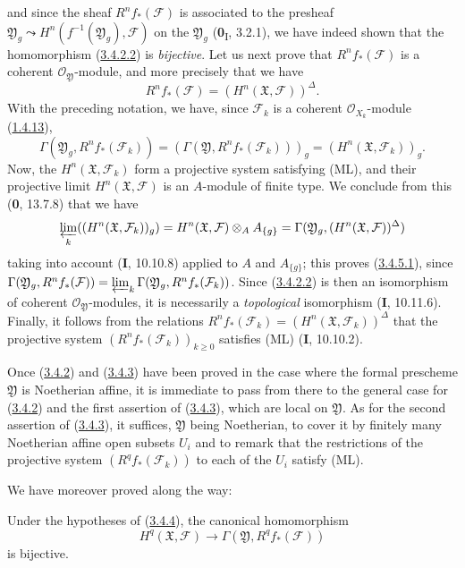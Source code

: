 \begin{env}[3.4.5]
and since the sheaf $R^nf_*(\mathcal F)$ is associated to the presheaf
$\mathfrak Y_g\leadsto H^n(f^{-1}(\mathfrak Y_g),\mathcal F)$ on the
$\mathfrak Y_g$ (\textbf{0}\textsubscript{I}, 3.2.1), we have indeed shown that
the homomorphism (\hyperref[III.3.4.2.2]{3.4.2.2}) is \emph{bijective}. Let us
next prove that $R^nf_*(\mathcal F)$ is a coherent $\mathcal O_{\mathfrak Y}$-module,
and more precisely that we have
\[
R^nf_*(\mathcal F)=(H^n(\mathfrak X,\mathcal F))^\Delta.
\tag{3.4.5.1}\label{III.3.4.5.1}
\]
With the preceding notation, we have, since $\mathcal F_k$ is a coherent
$\mathcal O_{X_k}$-module (\hyperref[III.1.4.13]{1.4.13}),
\[
\Gamma(\mathfrak Y_g,R^nf_*(\mathcal F_k))
=(\Gamma(\mathfrak Y,R^nf_*(\mathcal F_k)))_g
=(H^n(\mathfrak X,\mathcal F_k))_g.
\]
Now, the $H^n(\mathfrak X,\mathcal F_k)$ form a projective system
satisfying (ML), and their projective limit $H^n(\mathfrak X,\mathcal F)$ is
an $A$-module of finite type. We conclude from this (\textbf{0}, 13.7.8) that we have
\[
\varprojlim_k((H^n(\mathfrak X,\mathcal F_k))_g)
=H^n(\mathfrak X,\mathcal F)\otimes_AA_{\{g\}}
=\Gamma(\mathfrak Y_g,(H^n(\mathfrak X,\mathcal F))^\Delta)
\]
taking into account (\textbf{I}, 10.10.8) applied to $A$ and $A_{\{g\}}$; this proves
(\hyperref[III.3.4.5.1]{3.4.5.1}), since $\Gamma(\mathfrak Y_g,R^nf_*(\mathcal F))
=\varprojlim_k\Gamma(\mathfrak Y_g,R^nf_*(\mathcal F_k))$.
Since (\hyperref[III.3.4.2.2]{3.4.2.2}) is then an isomorphism of coherent
$\mathcal O_{\mathfrak Y}$-modules, it is necessarily a
\emph{topological} isomorphism (\textbf{I}, 10.11.6). Finally, it follows from the relations
$R^nf_*(\mathcal F_k)=(H^n(\mathfrak X,\mathcal F_k))^\Delta$ that the projective
system $(R^nf_*(\mathcal F_k))_{k\geq0}$ satisfies (ML) (\textbf{I}, 10.10.2).

Once (\hyperref[III.3.4.2]{3.4.2}) and
(\hyperref[III.3.4.3]{3.4.3}) have been proved in the case where the formal
prescheme $\mathfrak Y$ is Noetherian affine, it is immediate to pass from there to the
general case for (\hyperref[III.3.4.2]{3.4.2}) and the first assertion of
(\hyperref[III.3.4.3]{3.4.3}), which are local on $\mathfrak Y$. As for
the second assertion of (\hyperref[III.3.4.3]{3.4.3}), it suffices,
$\mathfrak Y$ being Noetherian, to cover it by finitely many Noetherian
affine open subsets $U_i$ and to remark that the restrictions of the projective
system $(R^qf_*(\mathcal F_k))$ to each of the $U_i$ satisfy (ML).
\end{env}

We have moreover proved along the way:

\begin{corollary}[3.4.6]
\label{III.3.4.6}
Under the hypotheses of \textup{(\hyperref[III.3.4.4]{3.4.4})}, the canonical
homomorphism
\[
H^q(\mathfrak X,\mathcal F)
\longrightarrow\Gamma(\mathfrak Y,R^qf_*(\mathcal F))
\tag{3.4.6.1}\label{III.3.4.6.1}
\]
is bijective.
\end{corollary}

